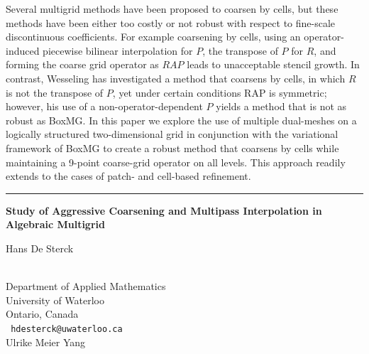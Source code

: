 \documentclass[twosided]{report}
\begin{document}
Several multigrid methods have
been proposed to coarsen by cells, but these methods have been either
too costly or not robust with respect to fine-scale discontinuous
coefficients. For example coarsening by cells, using an
operator-induced piecewise bilinear interpolation for $P$, the transpose
of $P$ for $R$, and forming the coarse grid operator as $RAP$ leads to
unacceptable stencil growth. In contrast, Wesseling has investigated a
method that coarsens by cells, in which $R$ is not the transpose of $P$,
yet under certain conditions RAP is symmetric; however, his use of a
non-operator-dependent $P$ yields a method that is not as robust as
BoxMG. In this paper we explore the use of multiple dual-meshes on a
logically structured two-dimensional grid in conjunction with the
variational framework of BoxMG to create a robust method that coarsens
by cells while maintaining a 9-point coarse-grid operator on all
levels. This approach readily extends to the cases of patch- and
cell-based refinement.

\begin{center}

\rule{6in}{1pt}
\end{center}

\begin{center}
{\large			\label{desterck}
{\bf
Study of Aggressive Coarsening and Multipass Interpolation in Algebraic
Multigrid
}

Hans De Sterck} \\
Department of Applied Mathematics
\\ University of Waterloo \\
Ontario, Canada
\\ {\tt
hdesterck@uwaterloo.ca
}
\\
Ulrike Meier Yang
\end{center}
\end{document}
